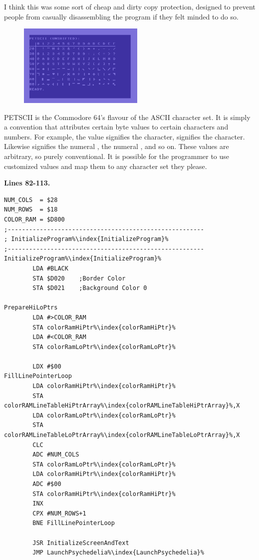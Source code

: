 I think this was some sort of cheap and dirty copy protection, designed to prevent people from casually disassembling the
program if they felt minded to do so. 
\bigskip
\begin{definition2}
\setlength{\intextsep}{0pt}%
\setlength{\columnsep}{3pt}%
\begin{figure}
  \includegraphics[width=6cm]{src/listing_commentary/petscii.png}
\end{figure}
\small
PETSCII is the Commodore 64's flavour of the ASCII character set. It is simply a convention that attributes certain byte
values to certain characters and numbers. For example, the value  signifies the  character, 
signifies the  character. Likewise  signifies the numeral ,  the numeral ,
and so on. These values are arbitrary, so purely conventional. It is possible for the programmer to use customized values
and map them to any character set they please.
\end{definition2}

\clearpage
\textbf{Lines 82-113. }
\begin{lstlisting}[caption=The initialization routine - visited only once\, at the very start of execution,escapechar=\%]
NUM_COLS  = $28
NUM_ROWS  = $18
COLOR_RAM = $D800
;-------------------------------------------------------
; InitializeProgram%\index{InitializeProgram}%
;-------------------------------------------------------
InitializeProgram%\index{InitializeProgram}%   
        LDA #BLACK
        STA $D020    ;Border Color
        STA $D021    ;Background Color 0

PrepareHiLoPtrs
        LDA #>COLOR_RAM
        STA colorRamHiPtr%\index{colorRamHiPtr}%
        LDA #<COLOR_RAM
        STA colorRamLoPtr%\index{colorRamLoPtr}%

        LDX #$00
FillLinePointerLoop
        LDA colorRamHiPtr%\index{colorRamHiPtr}%
        STA colorRAMLineTableHiPtrArray%\index{colorRAMLineTableHiPtrArray}%,X
        LDA colorRamLoPtr%\index{colorRamLoPtr}%
        STA colorRAMLineTableLoPtrArray%\index{colorRAMLineTableLoPtrArray}%,X
        CLC 
        ADC #NUM_COLS
        STA colorRamLoPtr%\index{colorRamLoPtr}%
        LDA colorRamHiPtr%\index{colorRamHiPtr}%
        ADC #$00
        STA colorRamHiPtr%\index{colorRamHiPtr}%
        INX 
        CPX #NUM_ROWS+1
        BNE FillLinePointerLoop

        JSR InitializeScreenAndText
        JMP LaunchPsychedelia%\index{LaunchPsychedelia}%

\end{lstlisting}
\clearpage


